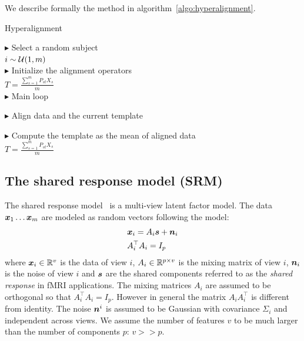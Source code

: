 We describe formally
the method in algorithm~\ref{algo:hyperalignment}.

\begin{algorithm}[H]
  \SetAlgoLined
  \caption{Hyperalignment}
  \label{algo:hyperalignment}
  $\blacktriangleright$ Select a random subject \\
  $i \sim \mathcal{U}(1, m)$ \\
  $\blacktriangleright$ Initialize the alignment operators \\
  $T = \frac{\sum_{s=1}^m P_{st} X_s}{m}$ \\

  $\blacktriangleright$ Main loop \\
  {
    $\blacktriangleright$ Align data and the current template \\

    $\blacktriangleright$ Compute the template as the mean of aligned data \\
    $T = \frac{\sum_{s=1}^m P_{st} X_s}{m}$ \\
    }
\end{algorithm}



\subsection{The shared response model (SRM)}
\label{sec:srm:review}
The shared response model~\cite{chen2015reduced} is a multi-view latent factor
model. The data $\boldsymbol{x}_1 \dots \boldsymbol{x}_m$ are modeled as random vectors following the model:
\begin{align}
 &\boldsymbol{x}_i = A_i \boldsymbol{s} + \boldsymbol{n}_i \\
  &A_i^{\top}A_i = I_p
  \label{eq:model:srm}
\end{align}
where $\boldsymbol{x}_i \in \mathbb{R}^v$ is the data of view $i$, $A_i \in \mathbb{R}^{p \times v}$ is the
mixing matrix of view $i$, $\boldsymbol{n}_i$ is the noise of view $i$ and $\boldsymbol{s}$ are the
shared components referred to as the \emph{shared response} in fMRI applications.
The mixing matrices
$A_i$ are assumed to be orthogonal so that $A_i^{\top}A_i = I_p$. However in
general the matrix $A_i A_i^{\top}$ is different from identity. The noise
$\boldsymbol{n}^i$ is assumed to be Gaussian with covariance $\Sigma_i$ and independent
across views. We assume the number of features $v$ to be much larger than the
number of components $p$: $v >> p$.

